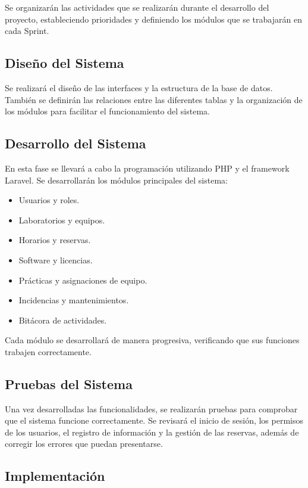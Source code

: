 Se organizarán las actividades que se realizarán durante el desarrollo del proyecto, estableciendo prioridades y definiendo los módulos que se trabajarán en cada Sprint.

\subsection{Diseño del Sistema}

Se realizará el diseño de las interfaces y la estructura de la base de datos. También se definirán las relaciones entre las diferentes tablas y la organización de los módulos para facilitar el funcionamiento del sistema.

\subsection{Desarrollo del Sistema}

En esta fase se llevará a cabo la programación utilizando PHP y el framework Laravel. Se desarrollarán los módulos principales del sistema:

\begin{itemize}
    \item Usuarios y roles.
    \item Laboratorios y equipos.
    \item Horarios y reservas.
    \item Software y licencias.
    \item Prácticas y asignaciones de equipo.
    \item Incidencias y mantenimientos.
    \item Bitácora de actividades.
\end{itemize}

Cada módulo se desarrollará de manera progresiva, verificando que sus funciones trabajen correctamente.

\subsection{Pruebas del Sistema}

Una vez desarrolladas las funcionalidades, se realizarán pruebas para comprobar que el sistema funcione correctamente. Se revisará el inicio de sesión, los permisos de los usuarios, el registro de información y la gestión de las reservas, además de corregir los errores que puedan presentarse.

\subsection{Implementación}

